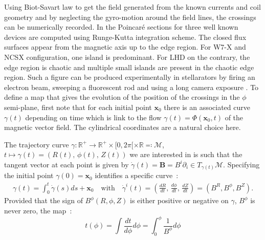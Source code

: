 Using Biot-Savart law to get the field generated from the known currents and coil geometry and by neglecting the gyro-motion around the field lines, the crossings can be numerically recorded. In  the Poincaré sections for three well known devices are computed using Runge-Kutta integration scheme. The closed flux surfaces appear from the magnetic axis up to the edge region. For W7-X and NCSX configuration, one island is predominant. For LHD on the contrary, the edge region is chaotic and multiple small islands are present in the chaotic edge region. Such a figure can be produced experimentally in stellarators by firing an electron beam, sweeping a fluorescent rod and using a long camera exposure \cite{pedersen_confirmation_2016}. To define a map that gives the evolution of the position of the crossings in the $\phi$ semi-plane, first note that for each initial point $\textbf{x}_0$ there is an associated curve $\gamma(t)$ depending on time which is link to the flow $\gamma(t) = \Phi(\textbf{x}_0, t)$ of the magnetic vector field. The cylindrical coordinates are a natural choice here.

\noindent
{}

The trajectory curve $\gamma : \mathbb{R}^+ \rightarrow \mathbb{R}^+\times[0,2\pi[\times\mathbb{R} \eqqcolon \mathcal{M}$, $t \mapsto \gamma(t) = (R(t),\,\phi(t),\,Z(t))$ we are interested in is such that the tangent vector at each point is given by $\dot{\gamma}(t)= \textbf{B} = B^i\partial_i \in T_{\gamma(t)}\mathcal{M}$. Specifying the initial point $\gamma(0) = \textbf{x}_0$ identifies a specific curve~:
\begin{align*}
    \gamma(t) = \int_0^t\dot{\gamma}(s)ds + \textbf{x}_0 \quad \text{with} \quad   \dot{\gamma}^i(t)= (\frac{dR}{dt},\,\frac{d\phi}{dt},\,\frac{dZ}{dt}) = (B^R, B^\phi, B^Z).
\end{align*}
Provided that the sign of $B^\phi(R, \phi, Z)$ is either positive or negative on $\gamma$, $B^\phi$ is never zero, the map~:
\begin{equation*}
    t(\phi) = \int \frac{dt}{d\phi}d\phi = \int_0^\phi \frac{1}{B^\phi}d\phi
\end{equation*}

